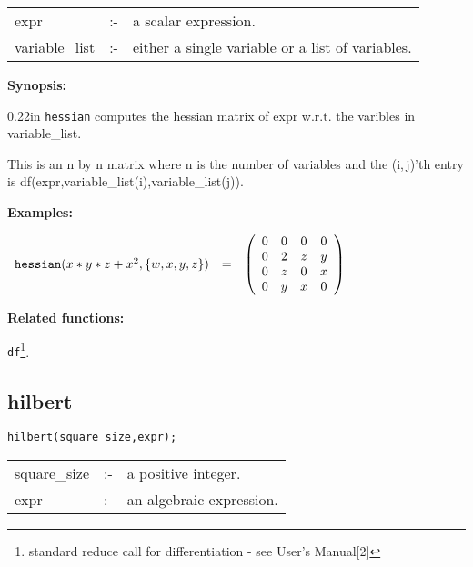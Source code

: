 \hspace*{0.1in}
\begin{tabular}{l l l}
expr           &:-& a scalar expression. \\
variable\_list &:-& either a single variable or a list of variables.
\end{tabular}

{\bf Synopsis:} %

\begin{addtolength}{\leftskip}{0.22in}
                {\tt hessian} computes the hessian matrix of expr w.r.t.
                the varibles in variable\_list.

This is an n by n matrix
                where n is the number of variables and the (i,$\,$j)'th
                entry is df(expr,variable\_list(i),variable\_list(j)).

\end{addtolength}

{\bf Examples:}

\begin{flushleft}
\hspace*{0.1in}
\begin{math}
\begin{array}{ccc}
{\tt hessian}(x*y*z+x^2,\{w,x,y,z\}) & = &
\left( \begin{array}{cccc} 0 & 0 & 0 & 0 \\ 0 & 2 & z & y \\ 0 & z & 0
& x \\ 0 & y & x & 0
\end{array} \right)
\end{array}
\end{math}
\end{flushleft}


{\bf Related functions:}

\hspace*{0.175in} {\tt df}\footnote{standard reduce call for
differentiation - see {\REDUCE} User's Manual[2]}.


\subsection{hilbert}


\hspace*{0.175in} {\tt hilbert(square\_size,expr);}

\hspace*{0.1in}
\begin{tabular}{l l l}
square\_size &:-& a positive integer. \\
expr         &:-& an algebraic expression.
\end{tabular}

